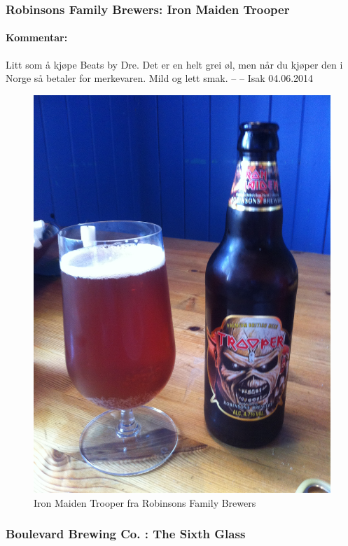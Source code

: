 \documentclass[12pt,a4paper,oneside,norsk]{article}
\begin{document}
\newpage
\subsubsection{Robinsons Family Brewers: Iron Maiden Trooper}
\paragraph{Kommentar:}Litt som å kjøpe Beats by Dre. Det er en helt grei øl, men når du kjøper den i Norge så betaler for merkevaren. Mild og lett smak. 
\newline
-- -- Isak 04.06.2014


\begin{figure} [H]
\centering
\includegraphics[scale=0.1, angle=270]{Bilder/Ol/thetrooper}
\caption{Iron Maiden Trooper fra Robinsons Family Brewers}
\end{figure}


\newpage
\subsubsection{Boulevard Brewing Co. : The Sixth Glass}
\end{document}

